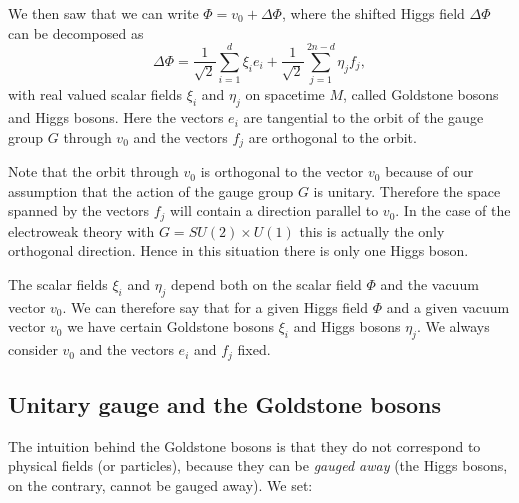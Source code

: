 \documentclass[12pt]{amsart}
\theoremstyle{definition}
\theoremstyle{remark}
\numberwithin{equation}{section}
\begin{document}
We then saw that we can write $\Phi=v_0+\Delta\Phi$, where the shifted Higgs field $\Delta\Phi$ can be decomposed as 
\begin{equation*}
\Delta\Phi=\frac{1}{\sqrt{2}}\sum_{i=1}^d\xi_ie_i+\frac{1}{\sqrt{2}}\sum_{j=1}^{2n-d}\eta_jf_j,
\end{equation*}
with real valued scalar fields $\xi_i$ and $\eta_j$ on spacetime $M$, called Goldstone bosons  and Higgs bosons. Here the vectors $e_i$ are tangential to the orbit of the gauge group $G$ through $v_0$ and the vectors $f_j$ are orthogonal to the orbit.

Note that the orbit through $v_0$ is orthogonal to the vector $v_0$ because of our assumption that the action of the gauge group $G$ is unitary. Therefore the space spanned by the vectors $f_j$ will contain a direction parallel to $v_0$. In the case of the electroweak theory with $G=SU(2)\times U(1)$ this is actually the only orthogonal direction. Hence in this situation there is only one Higgs boson.

The scalar fields $\xi_i$ and $\eta_j$ depend both on the scalar field $\Phi$ and the vacuum vector $v_0$. We can therefore say that for a given Higgs field $\Phi$ and a given vacuum vector $v_0$ we have certain Goldstone bosons $\xi_i$ and Higgs bosons $\eta_j$. We always consider $v_0$ and the vectors $e_i$ and $f_j$ fixed.

\subsection{Unitary gauge and the Goldstone bosons}
The intuition behind the Goldstone bosons is that they do not correspond to physical fields (or particles), because they can be {\em gauged away} (the Higgs bosons, on the contrary, cannot be gauged away). We set:
\end{document}
